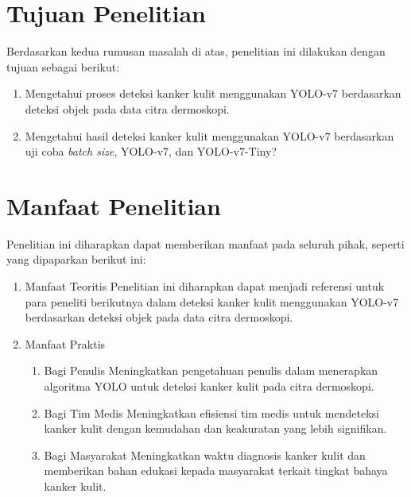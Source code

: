     \section{Tujuan Penelitian}
    Berdasarkan kedua rumusan masalah di atas, penelitian ini dilakukan dengan tujuan sebagai berikut:
    \begin{enumerate}
        \item Mengetahui proses deteksi kanker kulit menggunakan YOLO-v7 berdasarkan deteksi objek pada data citra dermoskopi.
        \item Mengetahui hasil deteksi kanker kulit menggunakan YOLO-v7 berdasarkan uji coba \textit{batch size}, YOLO-v7, dan YOLO-v7-Tiny?
    \end{enumerate}

    \section{Manfaat Penelitian}
    Penelitian ini diharapkan dapat memberikan manfaat pada seluruh pihak, seperti yang dipaparkan berikut ini:
    \begin{enumerate}
        \item Manfaat Teoritis
        Penelitian ini diharapkan dapat menjadi referensi untuk para peneliti berikutnya dalam deteksi kanker kulit menggunakan YOLO-v7 berdasarkan deteksi objek pada data citra dermoskopi.

        \item Manfaat Praktis
        \begin{enumerate}
            \item Bagi Penulis
            Meningkatkan pengetahuan penulis dalam menerapkan algoritma YOLO untuk deteksi kanker kulit pada citra dermoskopi.

            \item Bagi Tim Medis
            Meningkatkan efisiensi tim medis untuk mendeteksi kanker kulit dengan kemudahan dan keakuratan yang lebih signifikan.

            \item Bagi Masyarakat
            Meningkatkan waktu diagnosis kanker kulit dan memberikan bahan edukasi kepada masyarakat terkait tingkat bahaya kanker kulit.
        \end{enumerate}
    \end{enumerate}

